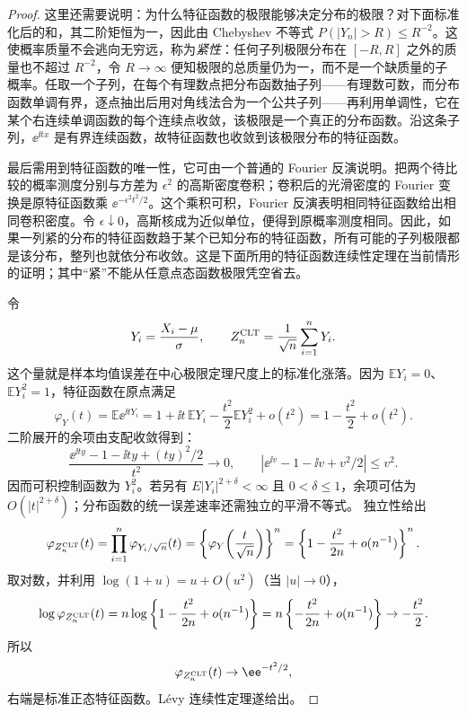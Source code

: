 \begin{proof}
这里还需要说明：为什么特征函数的极限能够决定分布的极限？对下面标准化后的和，其二阶矩恒为一，因此由
Chebyshev 不等式 \(P(|Y_n|>R)\le R^{-2}\)。这使概率质量不会逃向无穷远，称为\emph{紧性}：任何子列极限分布在 \([-R,R]\) 之外的质量也不超过 \(R^{-2}\)，令 \(R\to\infty\) 便知极限的总质量仍为一，而不是一个缺质量的子概率。任取一个子列，在每个有理数点把分布函数抽子列——有理数可数，而分布函数单调有界，逐点抽出后用对角线法合为一个公共子列——再利用单调性，它在某个右连续单调函数的每个连续点收敛，该极限是一个真正的分布函数。沿这条子列，\(\ee^{\ii tx}\) 是有界连续函数，故特征函数也收敛到该极限分布的特征函数。

最后需用到特征函数的唯一性，它可由一个普通的 Fourier 反演说明。把两个待比较的概率测度分别与方差为 \(\epsilon^2\) 的高斯密度卷积；卷积后的光滑密度的 Fourier 变换是原特征函数乘 \(\ee^{-\epsilon^2t^2/2}\)。这个乘积可积，Fourier 反演表明相同特征函数给出相同卷积密度。令 \(\epsilon\downarrow0\)，高斯核成为近似单位，便得到原概率测度相同。因此，如果一列紧的分布的特征函数趋于某个已知分布的特征函数，所有可能的子列极限都是该分布，整列也就依分布收敛。这是下面所用的特征函数连续性定理在当前情形的证明；其中“紧”不能从任意点态函数极限凭空省去。


令
\[
 Y_i=\frac{X_i-\mu}{\sigma},
 \qquad
 Z_n^{\rm CLT}=\frac1{\sqrt n}\sum_{i=1}^nY_i.
\]
这个量就是样本均值误差在中心极限定理尺度上的标准化涨落。因为 $\mathbb E Y_i=0$、$\mathbb E Y_i^2=1$，特征函数在原点满足
\[
 \varphi_Y(t)
 =\mathbb E\ee^{\ii tY_i}
 =1+\ii t\,\mathbb E Y_i-\frac{t^2}{2}\mathbb E Y_i^2+o(t^2)
 =1-\frac{t^2}{2}+o(t^2).
\]
二阶展开的余项由支配收敛得到：
\[
 \frac{\ee^{\ii ty}-1-\ii ty+(ty)^2/2}{t^2}\longrightarrow0,
 \qquad
 \left|\ee^{\ii v}-1-\ii v+v^2/2\right|\le v^2.
\]
因而可积控制函数为 $Y_i^2$。若另有 $E|Y_i|^{2+\delta}<\infty$ 且 $0<\delta\le1$，余项可估为 $O(|t|^{2+\delta})$；分布函数的统一误差速率还需独立的平滑不等式。
独立性给出
\[
 \varphi_{Z_n^{\rm CLT}}(t)
 =\prod_{i=1}^n\varphi_{Y_i/\sqrt n}(t)
 =\left\{\varphi_Y\!\left(\frac{t}{\sqrt n}\right)\right\}^n
 =\left\{1-\frac{t^2}{2n}+o(n^{-1})\right\}^n.
\]
取对数，并利用 $\log(1+u)=u+O(u^2)$（当 $|u|\to0$），
\[
 \log\varphi_{Z_n^{\rm CLT}}(t)
 =n\log\left\{1-\frac{t^2}{2n}+o(n^{-1})\right\}
 =n\left\{-\frac{t^2}{2n}+o(n^{-1})\right\}
 \to-\frac{t^2}{2}.
\]
所以
\[
 \varphi_{Z_n^{\rm CLT}}(t)\to\ee^{-t^2/2},
\]
右端是标准正态特征函数。L\'evy 连续性定理遂给出。

\end{proof}

